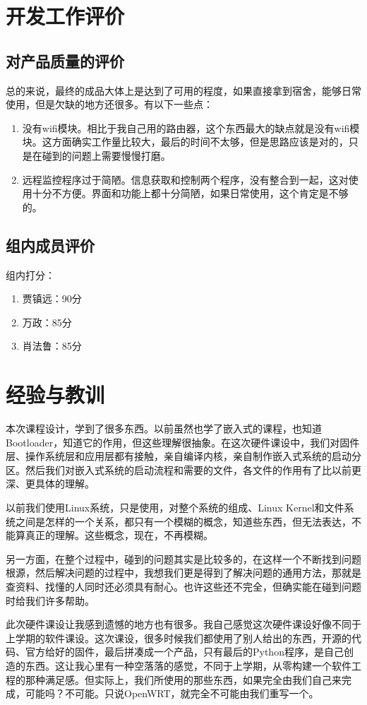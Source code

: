\documentclass{itecreport-zh}
\begin{document}
\chapter{开发工作评价}
\section{对产品质量的评价}
总的来说，最终的成品大体上是达到了可用的程度，如果直接拿到宿舍，能够日常使用，但是欠缺的地方还很多。有以下一些点：
\begin{enumerate}
  \item 没有wifi模块。相比于我自己用的路由器，这个东西最大的缺点就是没有wifi模块。这方面确实工作量比较大，最后的时间不太够，但是思路应该是对的，只是在碰到的问题上需要慢慢打磨。
  \item 远程监控程序过于简陋。信息获取和控制两个程序，没有整合到一起，这对使用十分不方便。界面和功能上都十分简陋，如果日常使用，这个肯定是不够的。
\end{enumerate}
\section{组内成员评价}
组内打分：
\begin{enumerate}
  \item 贾镇远：90分
  \item 万政：85分
  \item 肖法鲁：85分
\end{enumerate}
\chapter{经验与教训}
本次课程设计，学到了很多东西。以前虽然也学了嵌入式的课程，也知道Bootloader，知道它的作用，但这些理解很抽象。在这次硬件课设中，我们对固件层、操作系统层和应用层都有接触，亲自编译内核，亲自制作嵌入式系统的启动分区。然后我们对嵌入式系统的启动流程和需要的文件，各文件的作用有了比以前更深、更具体的理解。


以前我们使用Linux系统，只是使用，对整个系统的组成、Linux Kernel和文件系统之间是怎样的一个关系，都只有一个模糊的概念，知道些东西，但无法表达，不能算真正的理解。这些概念，现在，不再模糊。


另一方面，在整个过程中，碰到的问题其实是比较多的，在这样一个不断找到问题根源，然后解决问题的过程中，我想我们更是得到了解决问题的通用方法，那就是查资料、找懂的人同时还必须具有耐心。也许这些还不完全，但确实能在碰到问题时给我们许多帮助。


此次硬件课设让我感到遗憾的地方也有很多。我自己感觉这次硬件课设好像不同于上学期的软件课设。这次课设，很多时候我们都使用了别人给出的东西，开源的代码、官方给好的固件，最后拼凑成一个产品，只有最后的Python程序，是自己创造的东西。这让我心里有一种空落落的感觉，不同于上学期，从零构建一个软件工程的那种满足感。但实际上，我们所使用的那些东西，如果完全由我们自己来完成，可能吗？不可能。只说OpenWRT，就完全不可能由我们重写一个。
\end{document}

